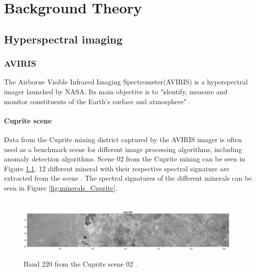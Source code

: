 \newpage
\chapter{Background Theory}
\label{sec:theory}

\section{Hyperspectral imaging}
\subsection{AVIRIS}
The Airborne Visible Infrared Imaging Spectrometer(AVIRIS) is a hyperspectral imager launched by NASA. Its main objective is to "identify, measure and monitor constituents of the Earth's surface and atmosphere" \cite{aviris}. 
\subsubsection{Cuprite scene}
Data from the Cuprite mining district \cite{Cuprite_data} captured by the AVIRIS imager is often used as a benchmark scene for different image processing algorithms, including anomaly detection algorithms. Scene 02 from the Cuprite mining can be seen in Figure \ref{fig:cuprite_mining_scene}. 12 different mineral with their respective spectral signature are extracted from the scene \cite{aviris_minerals}. The spectral signatures of the different minerals can be seen in Figure \ref{fig:minerals_Cuprite}. 

\begin{figure}[H]
\hbox{\hspace*{-1cm}                                              
   \includegraphics[scale=0.55]{images/AD_testing/original_band_220_22_1.png}}
  \caption{ Band 220 from the Cuprite scene 02 \cite{Cuprite_data}. } 
  \label{fig:cuprite_mining_scene}
\end{figure}

